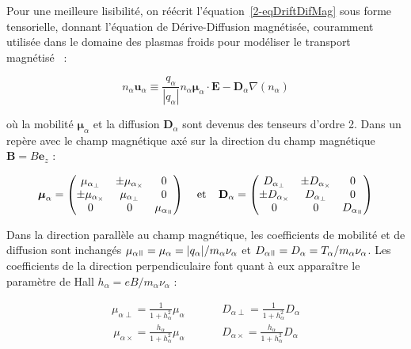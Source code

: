 \begin{refsection}
Pour une meilleure lisibilité, on réécrit l'équation~\ref{2-eqDriftDifMag}
sous forme tensorielle, donnant l'équation de Dérive-Diffusion magnétisée,
couramment utilisée dans le domaine des plasmas froids pour modéliser le
transport magnétisé~\parencite{HagelaarDeriveDiff, HagelaarProp} :

\begin{equation}
\label{2-eqDriftDifMag2}
n_\alpha\mathbf u_\alpha\equiv
\frac{q_\alpha}{|q_\alpha|} n_\alpha\boldsymbol{\mu}_\alpha\cdot \mathbf
E-\mathbf{D}_\alpha{\nabla\left( n_\alpha\right)}
\end{equation}

où la mobilité $\boldsymbol{\mu}_\alpha$ et la diffusion $\mathbf{D}_\alpha$
sont devenus des tenseurs d'ordre 2. Dans un repère avec le champ magnétique axé
sur la direction du champ magnétique $\mathbf B=B\mathbf e_z$ :

\begin{align}
\boldsymbol{\mu}_\alpha =
 \begin{pmatrix}
  \mu_{\alpha_\perp} & \pm\mu_{\alpha_\times} & 0 \\
  \pm\mu_{\alpha_\times} & \mu_{\alpha_\perp} & 0 \\
  0  & 0  & \mu_{\alpha_\para} 
 \end{pmatrix}\;\;\;\;\text{et}\;\;\;\;
 \mathbf D_\alpha =
 \begin{pmatrix}
  D_{\alpha_\perp} & \pm D_{\alpha_\times} & 0 \\
 \pm D_{\alpha_\times} & D_{\alpha_\perp} & 0 \\
  0  & 0  & D_{\alpha_\para} 
 \end{pmatrix}
\end{align}

Dans la direction parallèle au champ magnétique, les coefficients de mobilité et
de diffusion sont inchangés
$\mu_{\alpha\para}=\mu_{\alpha}=|q_\alpha|/m_\alpha\nu_\alpha$ et
$D_{\alpha\para}=D_\alpha=T_\alpha/m_\alpha\nu_\alpha$. Les coefficients de la
direction perpendiculaire font quant à eux apparaître le paramètre de Hall
$h_\alpha=eB/m_\alpha\nu_\alpha$ :

\begin{align}
\mu_{\alpha\perp}=\frac{1}{1+h_\alpha^2}\mu_\alpha\;\;\;\;\;\;\;\;
\;\;\;\;D_{\alpha\perp}=\frac{1}{1+h_\alpha^2}D_\alpha
\end{align}
\begin{align}
\mu_{\alpha\times}=\frac{h_\alpha}{1+h_\alpha^2}\mu_\alpha\;\;\;\;
\;\;\;\;\;\;\;\;D_{\alpha\times}=\frac{h_\alpha}{1+h_\alpha^2}D_\alpha
\end{align}


\end{refsection}
